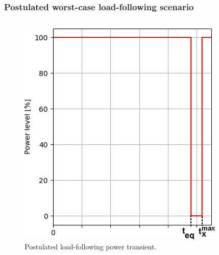 \begin{frame}
\frametitle{Postulated worst-case load-following scenario}
\vspace{-6mm}
\begin{columns}
	\column[t]{5.5cm}
	\begin{figure}[t]
		\includegraphics[width=\linewidth]{./images/power_load_curve.png}
		\vspace{-6mm}
		\caption{Postulated load-following power transient.}
	\end{figure}
	

\end{columns}
\end{frame}

